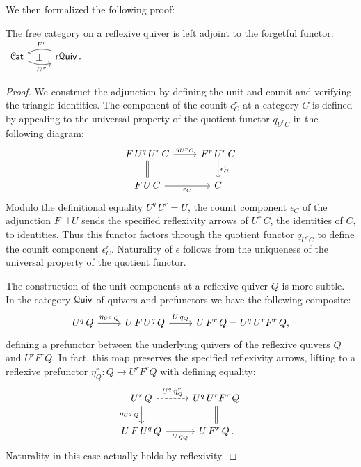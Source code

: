 \documentclass[a4paper,UKenglish,cleveref, autoref, thm-restate]{lipics-v2021}
\newcommand{\cat}[1]{\textup{\textsf{#1}}}%
\newcommand{\1}{\mathbbe{1}}
\newcommand{\2}{\mathbbe{2}}
\newcommand{\3}{\mathbbe{3}}
\newcommand{\Cat}{\mathcal{C}{\kern-.75pt}\cat{at}}
\newcommand{\Quiv}{\mathcal{Q}\cat{uiv}}
\newcommand{\rQuiv}{\cat{r}\mathcal{Q}\cat{uiv}}
\newcommand{\cdoc}[2][]{\href{https://leanprover-community.github.io/mathlib4_docs/find/?pattern=CategoryTheory.#1#2\#doc}{\texttt{#2}}}
\begin{document}
We then formalized the following proof:
\begin{proposition}[\cdoc{ReflQuiv.adj}]\label{prop:free-refl-quiv-adj}
  The free category on a reflexive quiver is left adjoint to the forgetful functor:
  $ \begin{tikzcd} \Cat \arrow[r, bend right=20, "U^r"' pos=.6] \arrow[r, phantom, "\bot"] & \rQuiv\,. \arrow[l, bend right=20, "F^r"' pos=.4] \end{tikzcd} $
\end{proposition}
\begin{proof}
We construct the adjunction by defining the unit and counit and verifying the triangle identities. The component of the counit $\epsilon^r_C$ at a category $C$ is defined by appealing to the universal property of the quotient functor $q_{U^rC}$ in the following diagram:
\[ \begin{tikzcd} F\,U^q\, U^r\, C \arrow[r, "q_{U^rC}"] \arrow[d, equals] & F^r\,U^r\, C \arrow[d, dashed, "\epsilon^r_C"] \\ F\,U\,C \arrow[r, "\epsilon_C"'] & C \end{tikzcd}\]
Modulo the definitional equality $U^q\,U^r=U$, the counit component $\epsilon_C$ of the adjunction $F \dashv U$ sends the specified reflexivity arrows of $U^r\,C$, the identities of $C$, to identities. Thus this functor factors through the quotient functor $q_{U^rC}$ to define the counit component $\epsilon^r_C$. Naturality of $\epsilon$ follows from the uniqueness of the universal property of the quotient functor.

The construction of the unit components at a reflexive quiver $Q$ is more subtle. In the category $\Quiv$ of quivers and prefunctors we have the following composite: \[ \begin{tikzcd} U^q\,Q \arrow[r, "\eta_{U^q\,Q}"] & U\,F\,U^q\,Q \arrow[r, "U\,q_Q"] & U\,F^r\,Q  = U^q\,U^rF^r\,Q, \end{tikzcd}\] defining a prefunctor between the underlying quivers of the reflexive quivers $Q$ and $U^rF^rQ$. In fact, this map preserves the specified reflexivity arrows, lifting to a reflexive prefunctor $\eta^r_Q \colon Q \to U^r F^r Q$ with defining equality:
\[ \begin{tikzcd} U^r\, Q \arrow[d, "\eta_{U^q\,Q}"'] \arrow[r, "U^q\,\eta^r_Q", dashed] & U^q\,U^rF^r\,Q \arrow[d, equals] \\ U\,F\,U^q\,Q\arrow[r, "U\,q_Q"'] & U\,F^r\,Q\, . \end{tikzcd}\]
Naturality in this case actually holds by reflexivity.


\end{proof}
\end{document}
